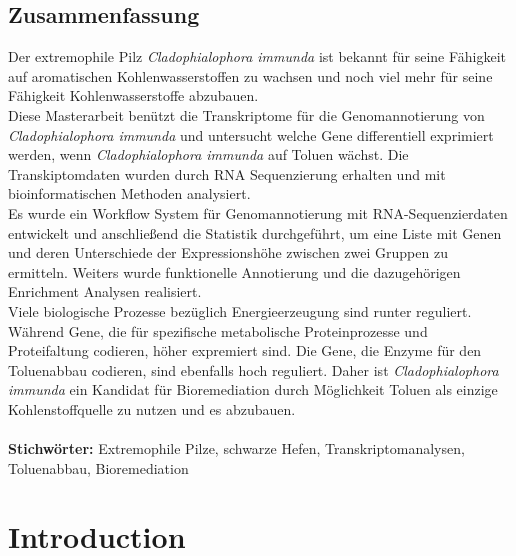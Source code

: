 \documentclass[12pt, a4paper]{report}
\begin{document}
\section*{Zusammenfassung}
Der extremophile Pilz \textit{Cladophialophora immunda} ist bekannt für seine Fähigkeit auf aromatischen Kohlenwasserstoffen zu wachsen und noch viel mehr für seine Fähigkeit Kohlenwasserstoffe abzubauen. \\
Diese Masterarbeit benützt die Transkriptome für die Genomannotierung von \textit{Cladophialophora immunda} und untersucht welche Gene differentiell exprimiert werden, wenn \textit{Cladophialophora immunda} auf Toluen wächst. Die Transkiptomdaten wurden durch RNA Sequenzierung erhalten und mit bioinformatischen Methoden analysiert. \\
Es wurde ein Workflow System für Genomannotierung mit RNA-Sequenzierdaten entwickelt und anschließend die Statistik durchgeführt, um eine Liste mit Genen und deren Unterschiede der Expressionshöhe zwischen zwei Gruppen zu ermitteln. Weiters wurde funktionelle Annotierung und die dazugehörigen Enrichment Analysen realisiert. \\
Viele biologische Prozesse bezüglich Energieerzeugung sind runter reguliert. \\ Während Gene, die für spezifische metabolische Proteinprozesse und Proteifaltung codieren, höher expremiert sind. Die Gene, die Enzyme für den Toluenabbau codieren, sind ebenfalls hoch reguliert. Daher ist \textit{Cladophialophora immunda} ein Kandidat für Bioremediation durch Möglichkeit Toluen als einzige Kohlenstoffquelle zu nutzen und es abzubauen.\\
\ \\
\textbf{Stichw\"orter:} Extremophile Pilze, schwarze Hefen, Transkriptomanalysen, Toluenabbau, Bioremediation
\newpage
\tableofcontents
\newpage
\setcounter{chapter}{1}
\setcounter{figure}{0}

\chapter*{Introduction} 
\end{document}
